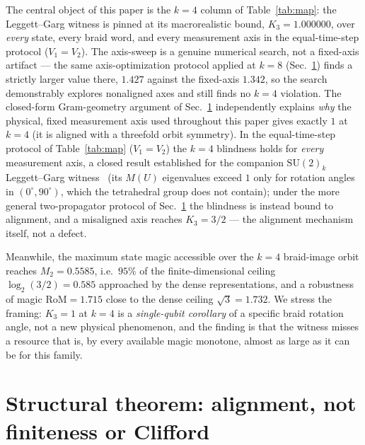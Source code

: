 \documentclass[aps,pra,twocolumn,superscriptaddress,longbibliography,floatfix,nofootinbib]{revtex4-2}
\begin{document}
The central object of this paper is the $k=4$ column of
Table~\ref{tab:map}: the Leggett--Garg witness is pinned at its
macrorealistic bound, $K_3=1.000000$, over \emph{every} state, every
braid word, and every measurement axis in the equal-time-step
protocol ($V_1{=}V_2$). The axis-sweep is a genuine
numerical search, not a fixed-axis artifact --- the same
axis-optimization protocol applied at $k=8$ (Sec.~\ref{sec:theorem})
finds a strictly larger value there, $1.427$ against the fixed-axis
$1.342$, so the search demonstrably explores nonaligned axes and
still finds no $k=4$ violation. The closed-form Gram-geometry argument
of Sec.~\ref{sec:theorem} independently explains \emph{why} the
physical, fixed measurement axis used throughout this paper gives
exactly $1$ at $k=4$ (it is aligned with a threefold orbit symmetry).
In the equal-time-step protocol of Table~\ref{tab:map} ($V_1{=}V_2$)
the $k=4$ blindness holds for \emph{every} measurement axis, a closed
result established for the companion $\mathrm{SU}(2)_k$ Leggett--Garg
witness~\cite{Sayim2026SU2k} (its $M(U)$ eigenvalues exceed $1$ only
for rotation angles in $(0^\circ,90^\circ)$, which the tetrahedral
group does not contain); under the more general two-propagator
protocol of Sec.~\ref{sec:theorem} the blindness is instead bound to
alignment, and a misaligned axis reaches $K_3=3/2$ --- the alignment
mechanism itself, not a defect.

Meanwhile, the maximum state magic accessible over the $k=4$
braid-image orbit reaches $M_2=0.5585$, i.e.\ $95\%$ of the
finite-dimensional ceiling
$\log_2(3/2)=0.585$ approached by the dense representations, and a
robustness of magic $\mathrm{RoM}=1.715$ close to the dense ceiling
$\sqrt3=1.732$. We stress the framing: $K_3=1$ at $k=4$ is a
\emph{single-qubit corollary} of a specific braid rotation angle, not
a new physical phenomenon, and the finding is that the witness misses
a resource that is, by every available magic monotone, almost as
large as it can be for this family.

\section{Structural theorem: alignment, not finiteness or Clifford}
\label{sec:theorem}
\end{document}
